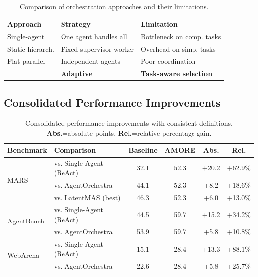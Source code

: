 \documentclass{article}
\theoremstyle{plain}
\theoremstyle{definition}
\theoremstyle{remark}
\begin{document}
\begin{table}[t]
	\caption{Comparison of orchestration approaches and their limitations.}
	\label{tab:orchestration_comparison}
	\centering
	\small
	\begin{tabular}{@{}lll@{}}
		\toprule
		\textbf{Approach} & \textbf{Strategy} & \textbf{Limitation} \\
		\midrule
		Single-agent & One agent handles all & Bottleneck on comp. tasks \\
		Static hierarch. & Fixed supervisor-worker & Overhead on simp. tasks \\
		Flat parallel & Independent agents & Poor coordination \\
		\textbf{\amore{}} & \textbf{Adaptive} & \textbf{Task-aware selection} \\
		\bottomrule
	\end{tabular}
\end{table}

\subsection{Consolidated Performance Improvements}

\begin{table}[h]
	\caption{Consolidated performance improvements with consistent definitions. \textbf{Abs.}=absolute points, \textbf{Rel.}=relative percentage gain.}
	\label{tab:performance-reconciliation}
	\centering
	\small
	\begin{tabular}{@{}llcccc@{}}
		\toprule
		\textbf{Benchmark} & \textbf{Comparison} & \textbf{Baseline} & \textbf{AMORE} & \textbf{Abs.} & \textbf{Rel.} \\
		\midrule
		\multirow{3}{*}{MARS} & vs. Single-Agent (ReAct) & 32.1 & 52.3 & +20.2 & +62.9\% \\
		& vs. AgentOrchestra & 44.1 & 52.3 & +8.2 & +18.6\% \\
		& vs. LatentMAS (best) & 46.3 & 52.3 & +6.0 & +13.0\% \\
		\midrule
		\multirow{2}{*}{AgentBench} & vs. Single-Agent (ReAct) & 44.5 & 59.7 & +15.2 & +34.2\% \\
		& vs. AgentOrchestra & 53.9 & 59.7 & +5.8 & +10.8\% \\
		\midrule
		\multirow{2}{*}{WebArena} & vs. Single-Agent (ReAct) & 15.1 & 28.4 & +13.3 & +88.1\% \\
		& vs. AgentOrchestra & 22.6 & 28.4 & +5.8 & +25.7\% \\
		\bottomrule
	\end{tabular}
\end{table}
\end{document}

